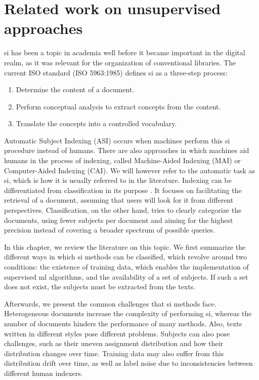 \section{Related work on unsupervised approaches} \label{subject_indexing}

\acrfull{si} has been a topic in academia well before it became important in the digital realm, as it was relevant for the organization of conventional libraries. The current ISO standard (ISO 5963:1985) defines \acrshort{si} as a three-step process:

\begin{enumerate}
    \item Determine the content of a document.
    \item Perform conceptual analysis to extract concepts from the content.
    \item Translate the concepts into a controlled vocabulary.
\end{enumerate}

Automatic Subject Indexing (ASI) occurs when machines perform this \acrshort{si} procedure instead of humans. There are also approaches in which machines aid humans in the process of indexing, called Machine-Aided Indexing (MAI) or Computer-Aided Indexing (CAI). We will however refer to the automatic task as \acrshort{si}, which is how it is usually referred to in the literature. Indexing can be differentiated from classification in its purpose \cite{golub2019automatic}. It focuses on facilitating the retrieval of a document, assuming that users will look for it from different perspectives. Classification, on the other hand, tries to clearly categorize the documents, using fewer subjects per document and aiming for the highest precision instead of covering a broader spectrum of possible queries.

In this chapter, we review the literature on this topic. We first summarize the different ways in which \acrshort{si} methods can be classified, which revolve around two conditions: the existence of training data, which enables the implementation of supervised \acrlong{ml} algorithms, and the availability of a set of subjects. If such a set does not exist, the subjects must be extracted from the texts.

Afterwards, we present the common challenges that \acrshort{si} methods face. Heterogeneous documents increase the complexity of performing \acrshort{si}, whereas the number of documents hinders the performance of many methods. Also, texts written in different styles pose different problems. Subjects can also pose challenges, such as their uneven assignment distribution and how their distribution changes over time. Training data may also suffer from this distribution drift over time, as well as label noise due to inconsistencies between different human indexers.

